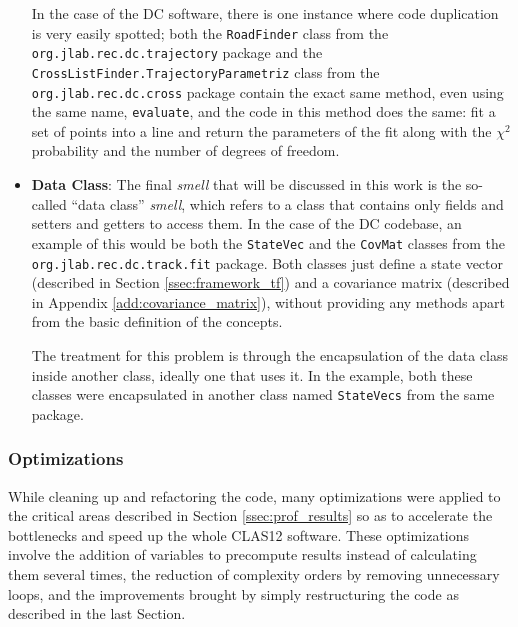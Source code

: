 \begin{itemize}
        In the case of the DC software, there is one instance where code duplication is very easily spotted; both the \texttt{RoadFinder} class from the \texttt{org.jlab.rec.dc.trajectory} package and the \texttt{CrossListFinder.TrajectoryParametriz} class from the \texttt{org.jlab.rec.dc.cross} package contain the exact same method, even using the same name, \texttt{evaluate}, and the code in this method does the same: fit a set of points into a line and return the parameters of the fit along with the $\chi^2$ probability and the number of degrees of freedom. %
    
        \item \textbf{Data Class}: The final \textit{smell} that will be discussed in this work is the so-called ``data class'' \textit{smell}, which refers to a class that contains only fields and setters and getters to access them.
        In the case of the DC codebase, an example of this would be both the \texttt{StateVec} and the \texttt{CovMat} classes from the \texttt{org.jlab.rec.dc.track.fit} package.
        Both classes just define a state vector (described in Section \ref{ssec:framework_tf}) and a covariance matrix (described in Appendix \ref{add:covariance_matrix}), without providing any methods apart from the basic definition of the concepts.
    
        The treatment for this problem is through the encapsulation of the data class inside another class, ideally one that uses it.
        In the example, both these classes were encapsulated in another class named \texttt{StateVecs} from the same package.
    \end{itemize}

\subsubsection{Optimizations}\label{sssec:optimizations}
While cleaning up and refactoring the code, many optimizations were applied to the critical areas described in Section \ref{ssec:prof_results} so as to accelerate the bottlenecks and speed up the whole CLAS12 software.
These optimizations involve the addition of variables to precompute results instead of calculating them several times, the reduction of complexity orders by removing unnecessary loops, and the improvements brought by simply restructuring the code as described in the last Section.

